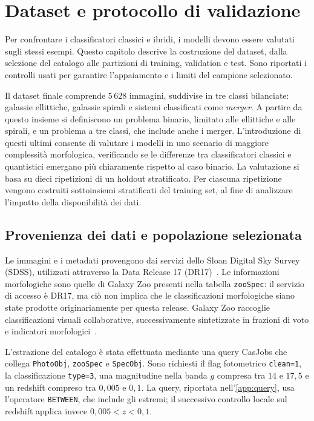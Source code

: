 \chapter{Dataset e protocollo di validazione}
\label{chap:dataset}

Per confrontare i classificatori classici e ibridi, i modelli devono
essere valutati sugli stessi esempi. Questo capitolo descrive la
costruzione del dataset, dalla selezione del catalogo alle partizioni
di training, validation e test. Sono riportati i controlli usati per
garantire l'appaiamento e i limiti del campione selezionato.

Il dataset finale comprende \(5\,628\) immagini, suddivise in tre classi
bilanciate: galassie ellittiche, galassie spirali e sistemi classificati
come \emph{merger}.
A partire da questo insieme si definiscono
un problema binario, limitato alle ellittiche e alle spirali, e un
problema a tre classi, che include anche i merger. L’introduzione di
questi ultimi consente di valutare i modelli in uno scenario di
maggiore complessità morfologica, verificando se le differenze tra
classificatori classici e quantistici emergano più chiaramente
rispetto al caso binario. La valutazione si basa su dieci
ripetizioni di un holdout stratificato. Per ciascuna ripetizione
vengono costruiti sottoinsiemi stratificati del training set, al fine di
analizzare l’impatto della disponibilità dei dati.

\section{Provenienza dei dati e popolazione selezionata}
\label{sec:provenienza}

Le immagini e i metadati provengono dai servizi dello Sloan Digital Sky
Survey (SDSS), utilizzati attraverso la Data Release 17
(DR17)~\cite{abdurrouf2022dr17}. Le informazioni morfologiche sono quelle
di Galaxy Zoo presenti nella tabella \texttt{zooSpec}: il servizio di accesso
è DR17, ma ciò non implica che le classificazioni morfologiche siano state
prodotte originariamente per questa release. Galaxy Zoo raccoglie
classificazioni visuali collaborative, successivamente sintetizzate in
frazioni di voto e indicatori morfologici~\cite{lintott2011galaxyzoo}.

L'estrazione del catalogo è stata effettuata mediante una query CasJobs
che collega \texttt{PhotoObj}, \texttt{zooSpec} e \texttt{SpecObj}. Sono
richiesti il flag fotometrico \texttt{clean=1}, la classificazione
\texttt{type=3}, una magnitudine nella banda \(g\) compresa tra \(14\) e
\(17{,}5\) e un redshift compreso tra \(0{,}005\) e \(0{,}1\).
La query, riportata nell'\cref{app:query}, usa l'operatore
\texttt{BETWEEN}, che include gli estremi; il successivo controllo locale
sul redshift applica invece \(0{,}005<z<0{,}1\).

